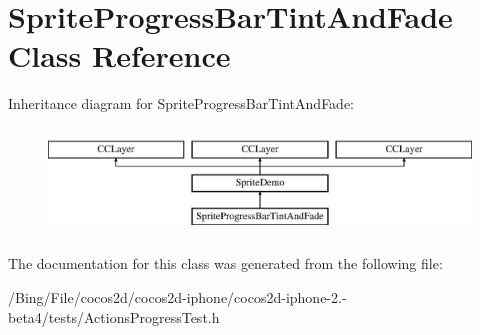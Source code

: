 \hypertarget{interface_sprite_progress_bar_tint_and_fade}{\section{Sprite\-Progress\-Bar\-Tint\-And\-Fade Class Reference}
\label{interface_sprite_progress_bar_tint_and_fade}
}
Inheritance diagram for Sprite\-Progress\-Bar\-Tint\-And\-Fade\-:\begin{figure}[H]
\begin{center}
\leavevmode
\includegraphics[height=2.857143cm]{interface_sprite_progress_bar_tint_and_fade}
\end{center}
\end{figure}


The documentation for this class was generated from the following file\-:\begin{DoxyCompactItemize}
\item 
/\-Bing/\-File/cocos2d/cocos2d-\/iphone/cocos2d-\/iphone-\/2.-\/beta4/tests/Actions\-Progress\-Test.\-h\end{DoxyCompactItemize}
